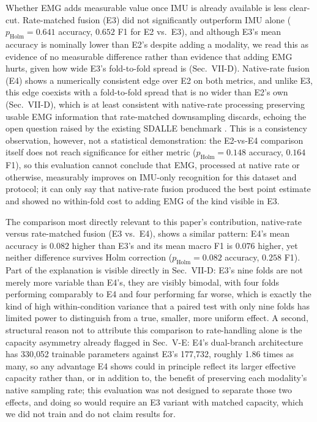 \documentclass[conference]{IEEEtran}
\begin{document}
Whether EMG adds measurable value once IMU is already available is
less clear-cut. Rate-matched fusion (E3) did not significantly
outperform IMU alone ($p_{\text{Holm}}=0.641$ accuracy, $0.652$ F1
for E2 vs.\ E3), and although E3's mean accuracy is nominally lower
than E2's despite adding a modality, we read this as evidence of no
measurable difference rather than evidence that adding EMG hurts,
given how wide E3's fold-to-fold spread is (Sec.~VII-D). Native-rate
fusion (E4) shows a numerically consistent edge over E2 on both
metrics, and unlike E3, this edge coexists with a fold-to-fold spread
that is no wider than E2's own (Sec.~VII-D), which is at least
consistent with native-rate processing preserving usable EMG
information that rate-matched downsampling discards, echoing the
open question raised by the existing SDALLE benchmark
\cite{farouk2026sdalle}. This is a consistency observation, however,
not a statistical demonstration: the E2-vs-E4 comparison itself does
not reach significance for either metric ($p_{\text{Holm}}=0.148$
accuracy, $0.164$ F1), so this evaluation cannot conclude that EMG,
processed at native rate or otherwise, measurably improves on
IMU-only recognition for this dataset and protocol; it can only say
that native-rate fusion produced the best point estimate and showed
no within-fold cost to adding EMG of the kind visible in E3.

The comparison most directly relevant to this paper's contribution,
native-rate versus rate-matched fusion (E3 vs.\ E4), shows a similar
pattern: E4's mean accuracy is $0.082$ higher than E3's and its mean
macro F1 is $0.076$ higher, yet neither difference survives Holm
correction ($p_{\text{Holm}}=0.082$ accuracy, $0.258$ F1). Part of the
explanation is visible directly in Sec.~VII-D: E3's nine folds are
not merely more variable than E4's, they are visibly bimodal, with
four folds performing comparably to E4 and four performing far worse,
which is exactly the kind of high within-condition variance that a
paired test with only nine folds has limited power to distinguish
from a true, smaller, more uniform effect. A second, structural
reason not to attribute this comparison to rate-handling alone is the
capacity asymmetry already flagged in Sec.~V-E: E4's dual-branch
architecture has 330{,}052 trainable parameters against E3's
177{,}732, roughly 1.86 times as many, so any advantage E4 shows
could in principle reflect its larger effective capacity rather than,
or in addition to, the benefit of preserving each modality's native
sampling rate; this evaluation was not designed to separate those two
effects, and doing so would require an E3 variant with matched
capacity, which we did not train and do not claim results for.
\end{document}
